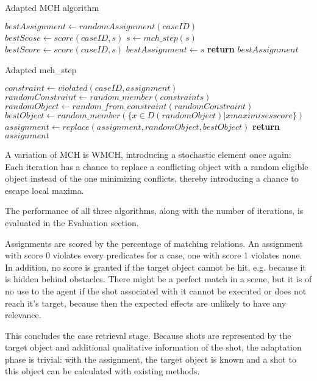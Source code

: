 \begin{algorithm}
    \caption{Adapted MCH algorithm}\label{alog:mch}
    \begin{algorithmic}[1]
        \State $bestAssignment\gets randomAssignment(caseID)$
        \State $bestScose \gets score(caseID, s)$
        \State $s\gets mch\_step(s)$
        \State $bestScore\gets score(caseID, s)$
        \State $bestAssignment\gets s$
        \EndIf
        \EndWhile
        \State \textbf{return} $bestAssignment$
        \EndProcedure
    \end{algorithmic}
\end{algorithm}


\begin{algorithm}
    \caption{Adapted mch\_step}\label{algo:mch_step}
    \begin{algorithmic}[1]
        \State $constraint \gets violated(caseID, assignment)$
        \State $randomConstraint\gets random\_member(constraints)$
        \State $randomObject \gets random\_from\_constraint(randomConstraint)$
        \State $bestObject \gets random\_member(\{x \in D(randomObject) \vert x maximises score\})$
        \State $assignment \gets replace(assignment, randomObject, bestObject)$
        \State \textbf{return} $assignment$
        \EndProcedure
    \end{algorithmic}
\end{algorithm}

A variation of MCH is WMCH, introducing a stochastic element once again: Each iteration has a chance to replace a conflicting object with a random eligible object instead of the one minimizing conflicts, thereby introducing a chance to escape local maxima.\cite{KapKis}

The performance of all three algorithms, along with the number of iterations, is evaluated in the Evaluation section.

Assignments are scored by the percentage of matching relations. An assignment with score 0 violates every predicates for a case, one with score 1 violates none. In addition, no score is granted if the target object cannot be hit, e.g. because it is hidden behind obstacles.
There might be a perfect match in a scene, but it is of no use to the agent if the shot associated with it cannot be executed or does not reach it's target, because then the expected effects are unlikely to have any relevance.

This concludes the case retrieval stage. Because shots are represented by the target object and additional qualitative information of the shot, the adaptation phase is trivial: with the assignment, the target object is known and a shot to this object can be calculated with existing methods.